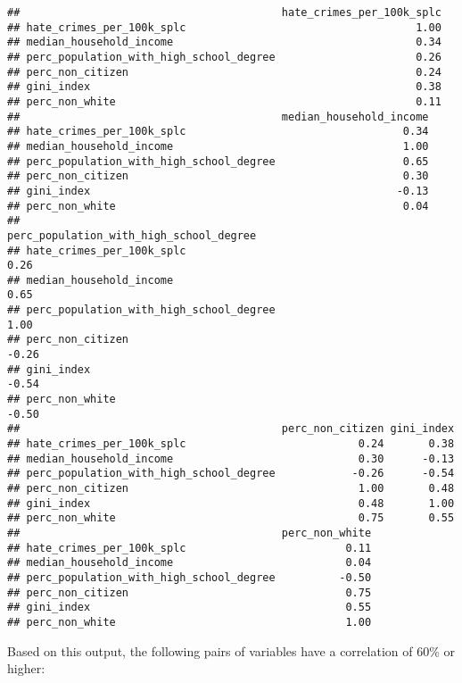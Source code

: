 \documentclass[
]{article}
\begin{document}
\begin{verbatim}
##                                         hate_crimes_per_100k_splc
## hate_crimes_per_100k_splc                                    1.00
## median_household_income                                      0.34
## perc_population_with_high_school_degree                      0.26
## perc_non_citizen                                             0.24
## gini_index                                                   0.38
## perc_non_white                                               0.11
##                                         median_household_income
## hate_crimes_per_100k_splc                                  0.34
## median_household_income                                    1.00
## perc_population_with_high_school_degree                    0.65
## perc_non_citizen                                           0.30
## gini_index                                                -0.13
## perc_non_white                                             0.04
##                                         perc_population_with_high_school_degree
## hate_crimes_per_100k_splc                                                  0.26
## median_household_income                                                    0.65
## perc_population_with_high_school_degree                                    1.00
## perc_non_citizen                                                          -0.26
## gini_index                                                                -0.54
## perc_non_white                                                            -0.50
##                                         perc_non_citizen gini_index
## hate_crimes_per_100k_splc                           0.24       0.38
## median_household_income                             0.30      -0.13
## perc_population_with_high_school_degree            -0.26      -0.54
## perc_non_citizen                                    1.00       0.48
## gini_index                                          0.48       1.00
## perc_non_white                                      0.75       0.55
##                                         perc_non_white
## hate_crimes_per_100k_splc                         0.11
## median_household_income                           0.04
## perc_population_with_high_school_degree          -0.50
## perc_non_citizen                                  0.75
## gini_index                                        0.55
## perc_non_white                                    1.00
\end{verbatim}

Based on this output, the following pairs of variables have a
correlation of 60\% or higher:
\end{document}
